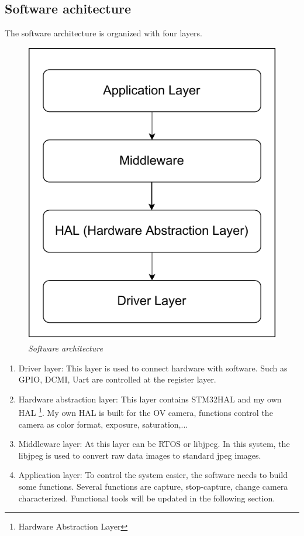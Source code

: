 \documentclass[D:/Latex/Internship/Report/Latex/Report.tex]{subfiles}
\begin{document}
		\subsection{Software achitecture}
		\label{subsec:SoftwareArchitec}
			The software architecture is organized with four layers. \\
			\begin{figure}[ht!]
				\centering
				\includegraphics[scale = 1]{Figure/Software_Architecture.pdf}
				\caption{\it Software architecture}
				\label{fig:Software Architec}
			\end{figure}
			\begin{enumerate}
				\item Driver layer: This layer is used to connect hardware with software. Such as GPIO, DCMI, Uart are controlled at the register layer. 
				\item Hardware abstraction layer: This layer contains STM32HAL and my own HAL {\footnote{Hardware Abstraction Layer}}. My own HAL is built for the OV camera, functions control the camera as color format, exposure, saturation,... 
				\item Middleware layer: At this layer can be RTOS or libjpeg. In this system, the libjpeg is used to convert raw data images to standard jpeg images. 
				\item Application layer: To control the system easier, the software needs to build some functions. Several functions are capture, stop-capture, change camera characterized. Functional tools will be updated in the following section.
			\end{enumerate}
\end{document}
